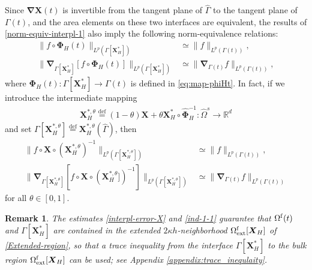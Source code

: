 \documentclass[11pt,reqno]{amsart}
\theoremstyle{definition}
\theoremstyle{plain}
\newtheorem{remark}{Remark}[section]
\numberwithin{theorem}{section}
\numberwithin{proposition}{section}
\numberwithin{lemma}{section}
\numberwithin{equation}{section}
\newcommand{\bs}[1]{\boldsymbol{#1}}
\newcommand{\uu}[1]  {{\bs{#1}} }
\newcommand{\grad}   { \uu{\nabla}    }
\renewcommand{\(}{\bigl(}
\renewcommand{\)}{\bigr)}
\def\eqd{\stackrel{\mathrm{def}}{=}}
\begin{document}
Since $\grad{\bs X}(t)$ is invertible from the tangent plane of $\widehat\Gamma$ to the tangent plane of $\Gamma(t)$, and the area elements on these two interfaces are equivalent, the results of \eqref{norm-equiv-interpl-1} also imply the following norm-equivalence relations:  
\begin{subequations}\label{norm-equiv-interpl-2}
\begin{align}
\|f \circ {\bs\Phi}_H(t) \|_{L^p(\Gamma[{\bs X}_H^*])} & \simeq \| f \|_{L^p(\Gamma(t))} , \\
\| \grad_{\Gamma[{\bs X}_H^*]} [f \circ {\bs\Phi}_H(t)] \|_{L^p(\Gamma[{\bs X}_H^*])} &\simeq \| \grad_{\Gamma(t)} f \|_{L^p(\Gamma(t))} ,
\end{align}
\end{subequations}
where ${\bs\Phi}_H(t):\Gamma[{\bs X}_H^*]\rightarrow \Gamma(t)$ is defined in \eqref{eq:map-phiHt}. In fact, if we introduce the intermediate mapping 
\begin{align}\label{def-XH-star-theta}
{\bs X}_H^{*,\theta} \eqd (1-\theta) {\bs X} + \theta {\bs X}_H^*\circ \widehat{\bs\Phi}_H^{-1}: \widehat\Omega^s\rightarrow \mathbb{R}^d
\end{align} 
and set $
\Gamma[{\bs X}_H^{*,\theta}] \eqd {\bs X}_H^{*,\theta}(\widehat\Gamma) $, 
then 
\begin{subequations}\label{norm-equiv-interpl-3}
\begin{align}
\|f \circ {\bs X} \circ ({\bs X}_H^{*,\theta})^{-1}\|_{L^p(\Gamma[{\bs X}_H^{*,\theta}])} &\simeq \| f \|_{L^p(\Gamma(t))} , \\
\| \grad_{\Gamma[{\bs X}_H^{*,\theta}]} [f \circ {\bs X} \circ ({\bs X}_H^{*,\theta}])^{-1}] \|_{L^p(\Gamma[{\bs X}_H^{*,\theta}])} &\simeq \| \grad_{\Gamma(t)} f \|_{L^p(\Gamma(t))} 
\end{align}
\end{subequations}
for all $\theta\in[0,1]$.


\begin{remark}\upshape\upshape 
The estimates \eqref{interpl-error-X} and \eqref{ind-1-1} guarantee that $\Omega^{\rm f}(t)$ and $\Gamma[\bs X_H^*]$ are contained in the extended $2\kappa h$-neighborhood $\Omega^{\rm f}_{\rm ext}[\bs X_H]$ of \eqref{Extended-region}, so that a trace inequality from the interface $\Gamma[\bs X_H^*]$ to the bulk region $\Omega^{\rm f}_{\rm ext}[\bs X_H]$ can be used; see Appendix \ref{appendix:trace_inequlaity}. 
\end{remark}
\end{document}

